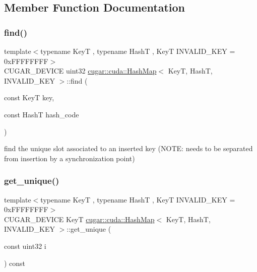 \subsection{Member Function Documentation}
\mbox{\label{structcugar_1_1cuda_1_1_hash_map_a9f8bf3bd7f80e1fc667fe506fbb8979f}} 
\subsubsection{\texorpdfstring{find()}{find()}}
{\footnotesize\ttfamily template$<$typename KeyT , typename HashT , KeyT I\+N\+V\+A\+L\+I\+D\+\_\+\+K\+EY = 0x\+F\+F\+F\+F\+F\+F\+FF$>$ \\
C\+U\+G\+A\+R\+\_\+\+D\+E\+V\+I\+CE uint32 \hyperlink{structcugar_1_1cuda_1_1_hash_map}{cugar\+::cuda\+::\+Hash\+Map}$<$ KeyT, HashT, I\+N\+V\+A\+L\+I\+D\+\_\+\+K\+EY $>$\+::find (\begin{DoxyParamCaption}\item[{const KeyT}]{key,  }\item[{const HashT}]{hash\+\_\+code }\end{DoxyParamCaption})\hspace{0.3cm}{\ttfamily [inline]}}

find the unique slot associated to an inserted key (N\+O\+TE\+: needs to be separated from insertion by a synchronization point) \mbox{\label{structcugar_1_1cuda_1_1_hash_map_aa76aa5471105fb11566b5915ee96ca46}} 
\subsubsection{\texorpdfstring{get\+\_\+unique()}{get\_unique()}}
{\footnotesize\ttfamily template$<$typename KeyT , typename HashT , KeyT I\+N\+V\+A\+L\+I\+D\+\_\+\+K\+EY = 0x\+F\+F\+F\+F\+F\+F\+FF$>$ \\
C\+U\+G\+A\+R\+\_\+\+D\+E\+V\+I\+CE KeyT \hyperlink{structcugar_1_1cuda_1_1_hash_map}{cugar\+::cuda\+::\+Hash\+Map}$<$ KeyT, HashT, I\+N\+V\+A\+L\+I\+D\+\_\+\+K\+EY $>$\+::get\+\_\+unique (\begin{DoxyParamCaption}\item[{const uint32}]{i }\end{DoxyParamCaption}) const\hspace{0.3cm}{\ttfamily [inline]}}

